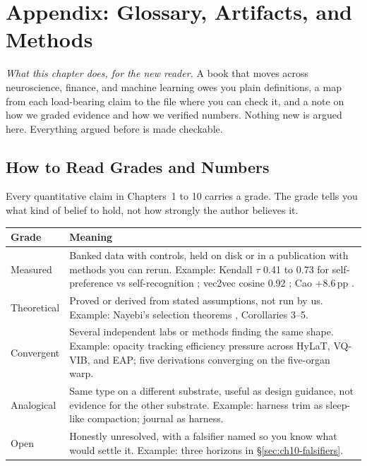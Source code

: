 \appendix
\chapter{Appendix: Glossary, Artifacts, and Methods}
\label{ch:appendix}

\begin{center}
\small\textit{What this chapter does, for the new reader.} A book that moves across neuroscience, finance, and machine learning owes you plain definitions, a map from each load-bearing claim to the file where you can check it, and a note on how we graded evidence and how we verified numbers. Nothing new is argued here. Everything argued before is made checkable.\end{center}

\section{How to Read Grades and Numbers}
\label{sec:appendix-grades}

Every quantitative claim in Chapters~1 to 10 carries a grade. The grade tells you what kind of belief to hold, not how strongly the author believes it.

\begin{center}
\small
\begin{tabular}{p{2.6cm}p{8.8cm}}
\toprule
Grade & Meaning \\
\midrule
Measured & Banked data with controls, held on disk or in a publication with methods you can rerun. Example: Kendall $\tau$ 0.41 to 0.73 for self-preference vs self-recognition \cite{panickssery2024}; vec2vec cosine 0.92 \cite{jha2025}; Cao +8.6\,pp \cite{cao2026}. \\
Theoretical & Proved or derived from stated assumptions, not run by us. Example: Nayebi's selection theorems \cite{nayebi2026}, Corollaries 3--5. \\
Convergent & Several independent labs or methods finding the same shape. Example: opacity tracking efficiency pressure across HyLaT, VQ-VIB, and EAP; five derivations converging on the five-organ warp. \\
Analogical & Same type on a different substrate, useful as design guidance, not evidence for the other substrate. Example: harness trim as sleep-like compaction; journal as harness. \\
Open & Honestly unresolved, with a falsifier named so you know what would settle it. Example: three horizons in \S\ref{sec:ch10-falsifiers}. \\
\bottomrule
\end{tabular}
\end{center}

